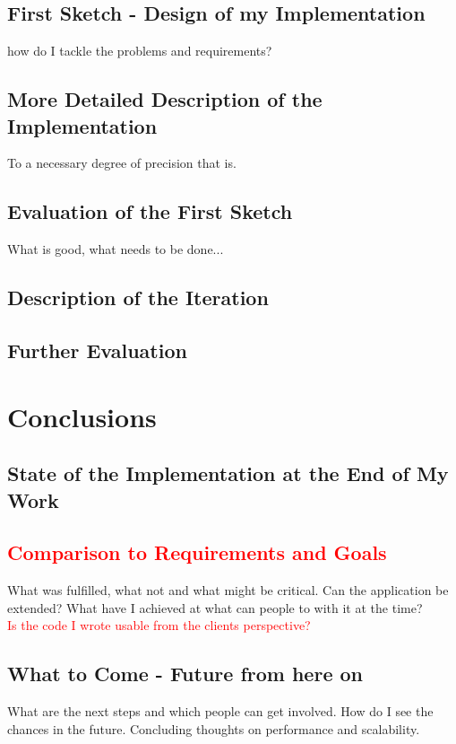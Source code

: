\documentclass[11p]{scrartcl}
\begin{document}
\subsection{First Sketch - Design of my Implementation}
how do I tackle the problems and requirements?
\subsection{More Detailed Description of the Implementation}
To a necessary degree of precision that is.
\subsection{Evaluation of the First Sketch}
What is good, what needs to be done...
\subsection{Description of the Iteration}
\subsection{Further Evaluation}




\section{Conclusions}
\label{sec:conclusions}
\subsection{State of the Implementation at the End of My Work}
\subsection{\textcolor{red}{Comparison to Requirements and Goals}}
What was fulfilled, what not and what might be critical. Can the application be extended? What have I achieved at what can people to with it at the time?\\
\textcolor{red}{Is the code I wrote usable from the clients perspective?}
\subsection{What to Come - Future from here on}
What are the next steps and which people can get involved. How do I see the chances in the future. Concluding thoughts on performance and scalability.
\end{document}
